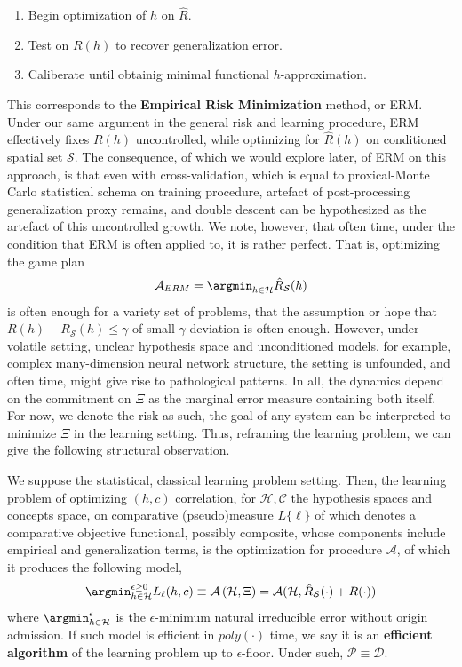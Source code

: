 \begin{enumerate}[itemsep=1pt,topsep=1pt]
    \item Begin optimization of $h$ on $\hat{R}$. 
    \item Test on $R(h)$ to recover generalization error. 
    \item Caliberate until obtainig minimal functional $h$-approximation. 
\end{enumerate}
This corresponds to the \textbf{Empirical Risk Minimization} method, or ERM. Under our same argument in the general risk and learning procedure, ERM effectively fixes $R(h)$ uncontrolled, while optimizing for $\hat{R}(h)$ on conditioned spatial set $\mathcal{S}$. The consequence, of which we would explore later, of ERM on this approach, is that even with cross-validation, which is equal to proxical-Monte Carlo statistical schema on training procedure, artefact of post-processing generalization proxy remains, and double descent can be hypothesized as the artefact of this uncontrolled growth. We note, however, that often time, under the condition that ERM is often applied to, it is rather perfect. That is, optimizing the game plan 
\begin{equation}
    \mathcal{A}_{ERM} = \argmin_{h\in \mathcal{H}} \hat{R}_{\mathcal{S}}(h)
\end{equation}
is often enough for a variety set of problems, that the assumption or hope that $R(h)-R_{\mathcal{S}}(h)\leq \gamma$ of small $\gamma$-deviation is often enough. However, under volatile setting, unclear hypothesis space and unconditioned models, for example, complex many-dimension neural network structure, the setting is unfounded, and often time, might give rise to pathological patterns. In all, the dynamics depend on the commitment on $\Xi$ as the marginal error measure containing both itself. For now, we denote the risk as such, the goal of any system can be interpreted to minimize $\Xi$ in the learning setting. Thus, reframing the learning problem, we can give the following structural observation. 

\begin{theorem}
    We suppose the statistical, classical learning problem setting. Then, the learning problem of optimizing $(h,c)$ correlation, for $\mathcal{H},\mathcal{C}$ the hypothesis spaces and concepts space, on comparative (pseudo)measure $L\{\ell\}$ of which denotes a comparative objective functional, possibly composite, whose components include empirical and generalization terms, is the optimization for procedure $\mathcal{A}$, of which it produces the following model,
    \begin{equation}
        \argmin_{h\in\mathcal{H}}^{\epsilon\geq 0} L_{\ell}(h,c) \equiv \mathcal{A}\left(\mathcal{H},\Xi\right) = \mathcal{A}(\mathcal{H}, \hat{R}_{\mathcal{S}}(\cdot)+R(\cdot))
    \end{equation}
    where $\argmin_{h\in\mathcal{H}}^{\epsilon}$ is the $\epsilon$-minimum natural irreducible error without origin admission. If such model is efficient in $poly(\cdot)$ time, we say it is an \textbf{efficient algorithm} of the learning problem up to $\epsilon$-floor. Under such, $\mathcal{P}\equiv \mathcal{D}$. 
\end{theorem}

